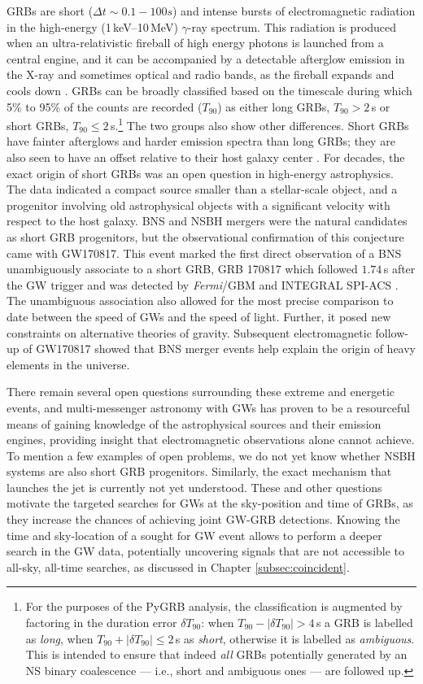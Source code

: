 \documentclass[binding=0.6cm, LaM]{sapthesis}
\begin{document}
	GRBs are short ($\Delta t \sim 0.1-100s$) and intense bursts of 
	electromagnetic radiation in the high-energy (1\,keV--10\,MeV) $\gamma$-ray spectrum.
	This radiation is produced when an ultra-relativistic fireball of high energy photons 
	is launched from a central engine, and it can be accompanied by a detectable afterglow emission 
	in the X-ray and sometimes optical and radio bands, as the fireball expands and cools down \cite{139}.
	GRBs can be broadly classified based on the timescale during which 5\% to 95\% of the counts are recorded ($T_{90}$)
	as either long GRBs, $T_{90} > 2\,$s or short GRBs, $T_{90} \leq 2\,$s.\footnote{For the purposes of the {\ttfamily PyGRB} analysis, the classification is augmented by factoring in the duration error $\delta T_{90}$: 
        when $T_{90}-|\delta T_{90}| > 4\,$s a GRB is labelled as {\it long},
	when $T_{90}+|\delta T_{90}| \leq 2\,$s as {\it short},
        otherwise it is labelled as {\it ambiguous}.  This is intended to ensure that indeed {\it all} GRBs potentially generated by an NS binary coalescence --- i.e., short and ambiguous ones --- are followed up.}
	The two groups also show other differences.
	Short GRBs have fainter afterglows and harder emission spectra than long GRBs; 
	they are also seen to have an offset relative to their host galaxy center \cite{154}.
	For decades, the exact origin of short GRBs was an open question in high-energy astrophysics.
	The data indicated a compact source smaller than a stellar-scale object, 
	and a progenitor involving old astrophysical objects with a significant velocity with respect to the host galaxy.
	BNS and NSBH mergers were the natural candidates as short GRB progenitors, 
	but the observational confirmation of this conjecture came with GW170817.
	This event marked the first direct observation of a BNS unambiguously associate to a short GRB, 
	GRB 170817 which followed $1.74\,$s after the GW trigger and was detected by {\it Fermi}/GBM and INTEGRAL SPI-ACS \cite{15}.
	The unambiguous association also allowed for the most precise comparison to date
	between the speed of GWs and the speed of light.
	Further, it posed new constraints on alternative theories of gravity. 
	Subsequent electromagnetic follow-up of GW170817 showed that BNS merger events 
	help explain the origin of heavy elements in the universe.

	There remain several open questions surrounding these extreme and energetic events, 
	and multi-messenger astronomy with GWs has proven to be a resourceful means of gaining 
	knowledge of the astrophysical sources and their emission engines, 
	providing insight that electromagnetic observations alone cannot achieve.
	To mention a few examples of open problems, we do not yet know whether NSBH systems are also short GRB progenitors.
	Similarly, the exact mechanism that launches the jet is currently not yet understood.
        These and other questions motivate the targeted searches for GWs at the sky-position and time of GRBs, 
	as they increase the chances of achieving joint GW-GRB detections.
	Knowing the time and sky-location of a sought for GW event
	allows to perform a deeper search in the GW data, potentially uncovering signals 
	that are not accessible to all-sky, all-time searches, as discussed in Chapter \ref{subsec:coincident}.
\end{document}
